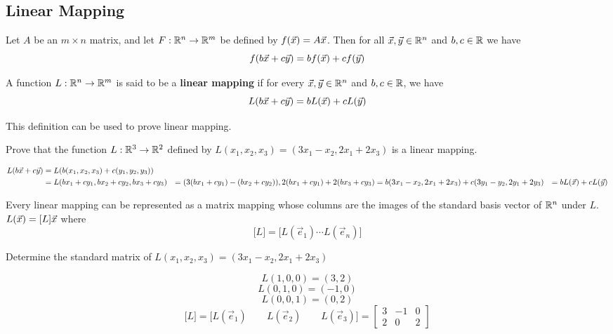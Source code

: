 \documentclass[english, 12pt]{article}
\begin{document}
\subsection{Linear Mapping}

\begin{thrm}
Let $A$ be an $m \times n$ matrix, and let $F: {\mathbb{R}}^n \rightarrow {\mathbb{R}}^m$ be defined by $f(\vec{x}) = A\vec{x}$. Then for all $\vec{x},\vec{y} \in {\mathbb{R}}^n$ and $b,c \in {\mathbb{R}}$ we have
\[f(b\vec{x} + c\vec{y}) = bf(\vec{x}) + cf(\vec{y})\]
\end{thrm}

\begin{defn}
A function $L : {\mathbb{R}}^n \rightarrow {\mathbb{R}}^m$ is said to be a \textbf{linear mapping} if for every $\vec{x},\vec{y} \in {\mathbb{R}}^n$ and $b,c \in {\mathbb{R}}$, we have
\[ L(b\vec{x} + c \vec{y}) = bL(\vec{x}) + cL(\vec{y})\]
\end{defn}

\begin{note}
This definition can be used to prove linear mapping.
\end{note}

\begin{exmp}
Prove that the function $L: {\mathbb{R}}^3 \rightarrow {\mathbb{R}}^2$ defined by $L(x_{1},x_{2},x_{3}) = (3x_{1} - x_{2},2x_{1} + 2 x_{3})$ is a linear mapping.
\begin{sol}
\begin{align*}
L(b\vec{x} + c \vec{y}) &= L(b(x_{1},x_{2},x_{3}) + c(y_{1},y_{2},y_{3})) \\
&= L( b x_{1} + c y_{1}, b x_{2} + c y _{2}, b x_{3} + c y_{3})
&= (3 (b x_{1} + c y_{1}) - (b x_{2} + c y_{2})), 2 (b x_{1} + c y_{1}) + 2 (b x_{3} + c y_{3})
&= b(3 x_{1} - x_{2}, 2 x_{1} + 2 x_{3}) + c (3 y_{1} - y_{2},2 y_{1} + 2 y_{3})
&= bL(\vec{x}) + c L(\vec{y})
\end{align*}
\end{sol}
\end{exmp}

\begin{thrm}
Every linear mapping can be represented as a matrix mapping whose columns are the images of the standard basis vector of ${\mathbb{R}}^n$ under $L$. $L(\vec{x}) = \lbrack L \rbrack \vec{x}$ where
\[\lbrack L \rbrack = \lbrack L(\vec{e}_{1}) \cdots L(\vec{e}_{n}) \rbrack\]
\end{thrm}


\begin{exmp}
Determine the standard matrix of $L(x_{1},x_{2},x_{3}) = (3x_{1} - x_{2} , 2 x_{1} + 2 x_{3})$
\begin{sol}
\[L(1,0,0) = (3,2)\]
\[ L(0,1,0) = (-1,0)\]
\[L (0,0,1) = (0,2)\]
\[ \lbrack L \rbrack = \lbrack L(\vec{e}_{1}) \qquad L(\vec{e}_{2}) \qquad L(\vec{e}_{3}) \rbrack = \begin{bmatrix} 3 & -1 & 0 \\ 2 & 0 & 2 \end{bmatrix}\]
\end{sol}
\end{exmp}
\end{document}
